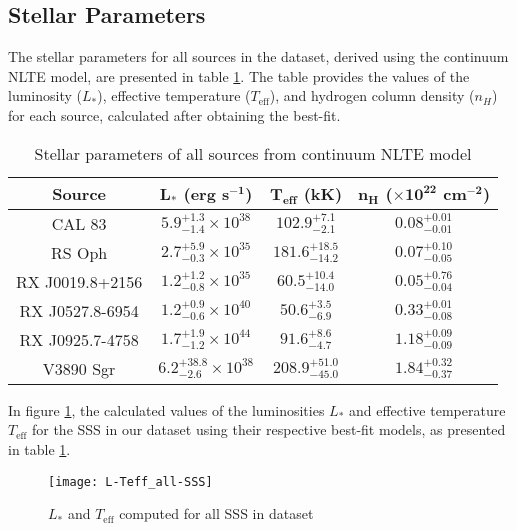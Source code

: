		\subsection{Stellar Parameters}
			The stellar parameters for all sources in the dataset, derived using the continuum NLTE model, are presented in table \ref{tab:sss-stellar-params}. The table provides the values of the luminosity ($L_*$), effective temperature ($T_\text{eff}$), and hydrogen column density ($n_H$) for each source, calculated after obtaining the best-fit.
			\renewcommand{\arraystretch}{1.8}
			\begin{table}[!htb]
				\centering
				\caption{Stellar parameters of all sources from continuum NLTE model}
				\label{tab:sss-stellar-params}
				\begin{tabular}{cccc}
				\hline
				{\textbf{Source}} & {$\boldsymbol{L_*}$ \textbf{(erg s$\boldsymbol{^{-1}}$)}} & {\textbf{$\boldsymbol{T_\text{eff}}$ (kK)}} & {\textbf{$\boldsymbol{n_H}$ ($\boldsymbol{\times 10^{22}}$ cm$\boldsymbol{^{-2}}$)}} \\
				\hline
				{CAL 83} & {$5.9_{-1.4}^{+1.3}\times 10^{38}$} & {$102.9_{-2.1}^{+7.1}$} & {$0.08_{-0.01}^{+0.01}$} \\
				{RS Oph} & {$2.7_{-0.3}^{+5.9}\times 10^{35}$} & {$181.6_{-14.2}^{+18.5}$} & {$0.07_{-0.05}^{+0.10}$} \\
				{RX J0019.8+2156} & {$1.2_{-0.8}^{+1.2}\times 10^{35}$} & {$60.5_{-14.0}^{+10.4}$} & {$0.05_{-0.04}^{+0.76}$} \\
				{RX J0527.8-6954} & {$1.2_{-0.6}^{+0.9}\times 10^{40}$} & {$50.6_{-6.9}^{+3.5}$} & {$0.33_{-0.08}^{+0.01}$} \\
				{RX J0925.7-4758} & {$1.7_{-1.2}^{+1.9}\times 10^{44}$} & {$91.6_{-4.7}^{+8.6}$} & {$1.18_{-0.09}^{+0.09}$} \\
				{V3890 Sgr} & {$6.2_{-2.6}^{+38.8}\times 10^{38}$} & {$208.9_{-45.0}^{+51.0}$} & {$1.84_{-0.37}^{+0.32}$} \\
				\hline
				\end{tabular}
			\end{table}
			\renewcommand{\arraystretch}{2.2}
			
			In figure \ref{result:L-Teff-SSS}, the calculated values of the luminosities $L_*$ and effective temperature $T_\text{eff}$ for the SSS in our dataset using their respective best-fit models, as presented in table \ref{tab:sss-stellar-params}.
			\begin{figure}[h!]
				\centering
				\texttt{[image: L-Teff\_all-SSS]}
				\caption{$L_*$ and $T_\text{eff}$ computed for all SSS in dataset}
				\label{result:L-Teff-SSS}
			\end{figure}
		
